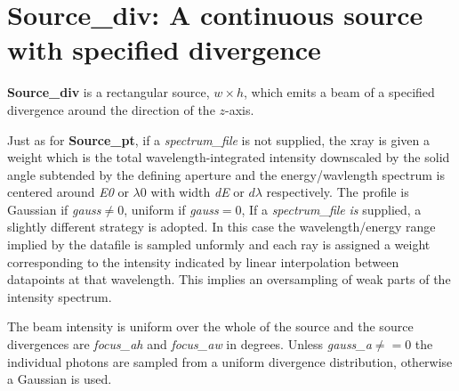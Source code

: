 \section{Source\_div: A continuous source with specified divergence}
\label{source-div}


\textbf{Source\_div} is a rectangular source, $w \times h$, which emits a
beam of a specified divergence around the direction of the $z$-axis.

Just as for \textbf{Source\_pt}, if a \textit{spectrum\_file} is not supplied, the xray
is given a weight which is the total wavelength-integrated intensity downscaled
by the solid angle subtended by the defining aperture and the energy/wavlength spectrum is centered around  \textit{E0} or  $\lambda 0$ with width
\textit{dE} or $d\lambda$ respectively. The profile is Gaussian if \textit{gauss}$\neq0$, uniform if \textit{gauss}$=0$,
If a \textit{spectrum\_file} \emph{is} supplied, a slightly different strategy is adopted. In this case the
wavelength/energy range implied by the datafile is sampled unformly and each ray is assigned
a weight corresponding to the intensity indicated by linear interpolation between datapoints
at that wavelength. This implies an oversampling of weak parts of the intensity spectrum.

The beam intensity is uniform over
the whole of the source and the source divergences are \textit{focus\_ah} and \textit{focus\_aw} in degrees.
Unless \textit{gauss\_a}$\neq=0$ the individual photons are sampled from a uniform divergence distribution, otherwise a Gaussian is used.


